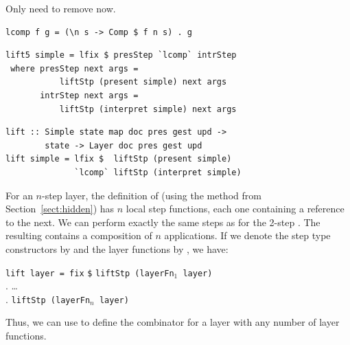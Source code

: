 \documentclass[preprint,natbib]{sigplanconf}
\begin{document}
Only need to remove  now. 

\begin{small}
\begin{verbatim}
lcomp f g = (\n s -> Comp $ f n s) . g
\end{verbatim}%
\end{small}

\begin{small} %
\begin{verbatim}
lift5 simple = lfix $ presStep `lcomp` intrStep
 where presStep next args = 
           liftStp (present simple) next args
       intrStep next args = 
           liftStp (interpret simple) next args
\end{verbatim}%
\end{small}


\begin{small} %
\begin{verbatim}
lift :: Simple state map doc pres gest upd ->
        state -> Layer doc pres gest upd
lift simple = lfix $  liftStp (present simple) 
              `lcomp` liftStp (interpret simple) 
\end{verbatim}%
\end{small}



For an $n$-step layer, the definition of  (using the method from Section~\ref{sect:hidden}) has $n$ local step functions, each one containing a reference to the next. \bc {} \ec We can perform exactly the same steps as for the 2-step . The resulting  contains a composition of $n$  applications. If we denote the step type constructors by  and the layer functions by , we have:

\begin{small}
\begin{tabbing}
{\tt lift layer = fix} \= {\tt \$} \= {\tt liftStp (layerFn$_1$ layer)} \\
                       \> .        \> \dots\ \\
                       \> .        \> {\tt liftStp (layerFn$_n$ layer)}\\
\end{tabbing}%
\end{small}

Thus, we can use   to define the  combinator for a layer with any number of layer functions.
\end{document}
